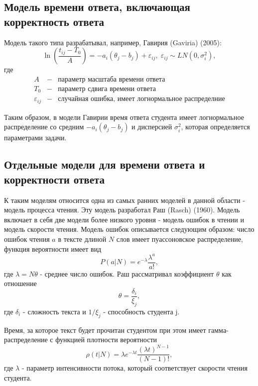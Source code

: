 \subsection{Модель времени ответа, включающая корректность ответа}

Модель такого типа разрабатывал, например, Гавирия (Gaviria) (2005):
\begin{equation}
\ln \left( \frac{t_{ij} - T_0}{A}\right) = -a_i(\theta_j - b_j) + \varepsilon_{ij},\; \varepsilon_{ij} \sim LN(0,\sigma_{i}^{2}),
\end{equation}
где
$$
\begin{array}{lll}
A &-& \mbox{параметр масштаба времени ответа}\\
T_0 &-& \mbox{параметр сдвига времени ответа}\\
\varepsilon_{ij} &-& \mbox{случайная ошибка, имеет логнормальное распределние}
\end{array}
$$

Таким образом, в модели Гавирии время ответа студента имеет логнормальное\\ распределение со средним $-a_i(\theta_j - b_j)$ и дисперсией $\sigma_{i}^{2}$, которая определяется параметрами задачи.

\subsection{Отдельные модели для времени ответа и корректности ответа}

К таким моделям относится одна из самых ранних моделей в данной области - модель процесса чтения. Эту модель разработал Раш (Rasch) (1960). Модель включает в себя две модели более низкого уровня - модель ошибок в чтении и модель скорости чтения.
Модель ошибок описывается следующим образом: число ошибок чтения $a$ в тексте длиной $N$ слов имеет пуассоновское распределение, функция вероятности имеет вид
\begin{equation}
P(a | N) = e^{-\lambda}\frac{\lambda^a}{a!},
\end{equation}
где $\lambda = N\theta$ - среднее число ошибок. Раш рассматривал коэффициент $\theta$ как отношение
\begin{equation}
\theta = \frac{\delta_i}{\xi_j},
\end{equation}
где $\delta_i$ - сложность текста и $1/\xi_j$ - способность студента j.

Время, за которое текст будет прочитан студентом при этом имеет гамма-распределение с функцией плотности вероятности
\begin{equation}
\rho (t | N) = \lambda e^{-\lambda t}\frac{(\lambda t)^{N-1}}{(N-1)!},
\end{equation}
где $\lambda$ - параметр интенсивности потока, который соответствует скорости чтения студента.

